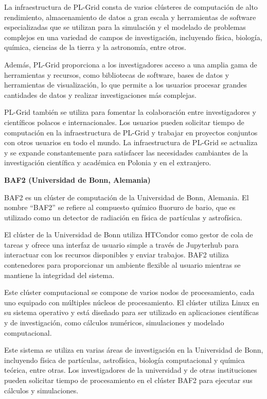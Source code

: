 \begin{spacing}{1.5}
  La infraestructura de PL-Grid consta de varios clústeres de computación de
  alto rendimiento, almacenamiento de datos a gran escala y herramientas de
  software especializadas que se utilizan para la simulación y el modelado de
  problemas complejos en una variedad de campos de investigación, incluyendo
  física, biología, química, ciencias de la tierra y la astronomía, entre otros.

  Además, PL-Grid proporciona a los investigadores acceso a una amplia gama de
  herramientas y recursos, como bibliotecas de software, bases de datos y
  herramientas de visualización, lo que permite a los usuarios procesar grandes
  cantidades de datos y realizar investigaciones más complejas.

  PL-Grid también se utiliza para fomentar la colaboración entre investigadores
  y científicos polacos e internacionales. Los usuarios pueden solicitar tiempo
  de computación en la infraestructura de PL-Grid y trabajar en proyectos
  conjuntos con otros usuarios en todo el mundo. La infraestructura de PL-Grid se
  actualiza y se expande constantemente para satisfacer las necesidades
  cambiantes de la investigación científica y académica en Polonia y en el
  extranjero. \cite{PL} \newline

  \textbf{BAF2 (Universidad de Bonn, Alemania)}

  BAF2 es un clúster de computación de la Universidad de Bonn, Alemania. El
  nombre ``BAF2'' se refiere al compuesto químico fluoruro de bario, que es
  utilizado como un detector de radiación en física de partículas y astrofísica.

  El clúster de la Universidad de Bonn utiliza HTCondor como gestor de cola de
  tareas y ofrece una interfaz de usuario simple a través de Jupyterhub para
  interactuar con los recursos disponibles y enviar trabajos. BAF2 utiliza
  contenedores para proporcionar un ambiente flexible al usuario mientras se
  mantiene la integridad del sistema.

  Este clúster computacional se compone de varios nodos de procesamiento, cada
  uno equipado con múltiples núcleos de procesamiento. El clúster utiliza Linux
  en su sistema operativo y está diseñado para ser utilizado en aplicaciones
  científicas y de investigación, como cálculos numéricos, simulaciones y
  modelado computacional.

  Este sistema se utiliza en varias áreas de investigación en la Universidad de
  Bonn, incluyendo física de partículas, astrofísica, biología computacional y
  química teórica, entre otras. Los investigadores de la universidad y de otras
  instituciones pueden solicitar tiempo de procesamiento en el clúster BAF2 para
  ejecutar sus cálculos y simulaciones.


\end{spacing}
